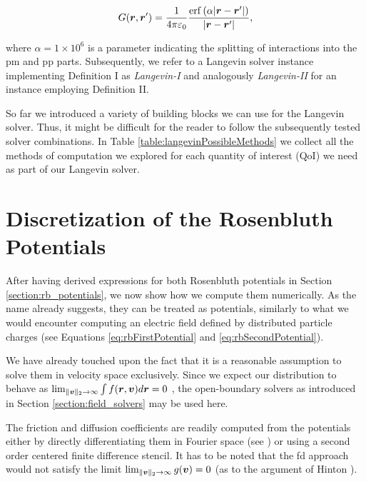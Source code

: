 \begin{equation}
    G(\vect r, \vect r') = \frac{1}{4\pi \vp} \frac{\erf{(\alpha |\vect r -
    \vect r'|)}}{|\vect r - \vect r'|},
    \label{eq:greenPoissonDefinitions}
\end{equation}

where $\alpha= 1 \times 10^6$ is a parameter indicating the splitting of interactions into the
\gls{pm} and \gls{pp} parts.
Subsequently, we refer to a Langevin solver instance implementing Definition I as \emph{Langevin-I} and analogously \emph{Langevin-II} for an
instance employing Definition II.

So far we introduced a variety of building blocks we can use for the Langevin solver. Thus, it might
be difficult for the reader to follow the subsequently tested solver combinations.
In Table \ref{table:langevinPossibleMethods} we collect all the methods of computation
we explored for each quantity of interest (QoI) we need as part of our Langevin solver.

\section{Discretization of the Rosenbluth Potentials}
\label{section:rb_discretization}

After having derived expressions for both Rosenbluth potentials in Section
\ref{section:rb_potentials}, we now show how we compute them numerically.
As the name already suggests, they can be treated as potentials, similarly to what we would 
encounter computing an electric field defined by distributed particle charges (see Equations
\ref{eq:rbFirstPotential} and \ref{eq:rbSecondPotential}).

We have already touched upon the fact that it is a reasonable assumption to solve them in velocity space exclusively.
Since we expect our distribution to behave as $\lim_{\lVert \boldsymbol{v} \rVert_2 \to \infty} \int f(\boldsymbol{r},
\boldsymbol{v}) d\boldsymbol{r} = 0$ \cite{hinton1983collisional}, the open-boundary solvers as introduced
in Section \ref{section:field_solvers} may be used here.

The friction and diffusion coefficients are readily computed from the potentials either by directly
differentiating them in Fourier space (see \cite{johnson2011FFTdifferentialtion}) or using a second
order centered finite difference stencil.
It has to be noted that the \gls{fd} approach would not satisfy the limit $\lim_{\lVert \boldsymbol{v} \rVert_2 \to \infty}
g(\boldsymbol{v}) = 0$ (as to the argument of Hinton \cite{hinton1983collisional}).

